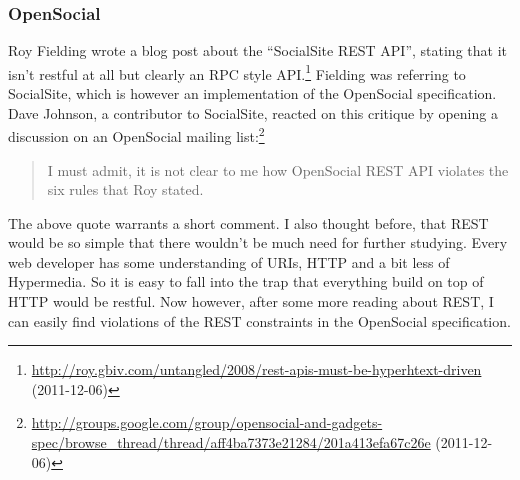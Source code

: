 \documentclass[12pt,a4paper]{scrartcl}		%
\newcommand{\citeurl}[2]{\url{#1} (#2)}
\begin{document}

\subsubsection{OpenSocial}
\label{sec:opensocial}

Roy Fielding wrote a blog post about the ``SocialSite REST API'', stating that
it isn't restful at all but clearly an RPC style
API.\footnote{\citeurl{http://roy.gbiv.com/untangled/2008/rest-apis-must-be-hyperhtext-driven}{2011-12-06}}
Fielding was referring to SocialSite, which is however an implementation of the
OpenSocial specification. Dave Johnson, a contributor to SocialSite, reacted on
this critique by opening a discussion on an OpenSocial mailing
list:\footnote{\citeurl{http://groups.google.com/group/opensocial-and-gadgets-spec/browse_thread/thread/aff4ba7373e21284/201a413efa67c26e}{2011-12-06}}
\begin{quote}
  I must admit, it is not clear to me how OpenSocial REST API violates the six
  rules that Roy stated.
\end{quote}
The above quote warrants a short comment. I also thought before, that REST would
be so simple that there wouldn't be much need for further studying. Every web
developer has some understanding of URIs, HTTP and a bit less of Hypermedia. So
it is easy to fall into the trap that everything build on top of HTTP would be
restful. Now however, after some more reading about REST, I can easily find
violations of the REST constraints in the OpenSocial specification.
\end{document}
